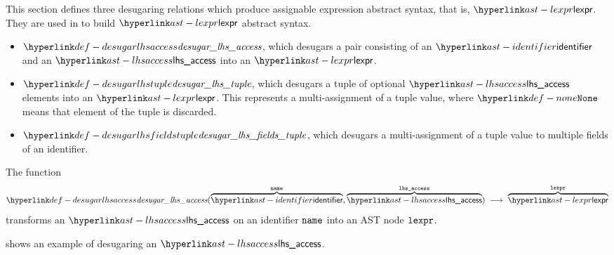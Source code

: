 This section defines three desugaring relations which produce assignable expression abstract syntax, that is, $\lexpr$.
They are used in  to build $\lexpr$ abstract syntax.
\begin{itemize}
  \item $\desugarlhsaccess$, which desugars a pair consisting of an $\identifier$ and an $\lhsaccess$ into an $\lexpr$.
  \item $\desugarlhstuple$, which desugars a tuple of optional $\lhsaccess$ elements into an $\lexpr$.
    This represents a multi-assignment of a tuple value, where $\None$ means that element of the tuple is discarded.
  \item $\desugarlhsfieldstuple$, which desugars a multi-assignment of a tuple value to multiple fields of an identifier.
\end{itemize}

\hypertarget{def-desugarlhsaccess}{}
The function
\[
  \desugarlhsaccess(\overname{\identifier}{\name}, \overname{\lhsaccess}{\vlhsaccess}) \;\aslto\; \overname{\lexpr}{\vlexpr}
\]
transforms an $\lhsaccess$ on an identifier $\name$ into an AST node $\vlexpr$.

 shows an example of desugaring an $\lhsaccess$.

\begin{mathpar}
\end{mathpar}

